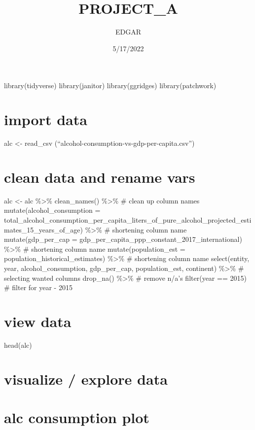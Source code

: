 \documentclass[
]{article}
\title{PROJECT\_A}
\author{EDGAR}
\date{5/17/2022}
\begin{document}
\maketitle

{
\setcounter{tocdepth}{2}
\tableofcontents
}
library(tidyverse) library(janitor) library(ggridges) library(patchwork)

\hypertarget{import-data}{%
\section{import data}\label{import-data}}

alc \textless- read\_csv (``alcohol-consumption-vs-gdp-per-capita.csv'')

\hypertarget{clean-data-and-rename-vars}{%
\section{clean data and rename vars}\label{clean-data-and-rename-vars}}

alc \textless- alc \%\textgreater\% clean\_names() \%\textgreater\% \#
clean up column names mutate(alcohol\_consumption =
total\_alcohol\_consumption\_per\_capita\_liters\_of\_pure\_alcohol\_projected\_estimates\_15\_years\_of\_age)
\%\textgreater\% \# shortening column name mutate(gdp\_per\_cap =
gdp\_per\_capita\_ppp\_constant\_2017\_international) \%\textgreater\%
\# shortening column name mutate(population\_est =
population\_historical\_estimates) \%\textgreater\% \# shortening column
name select(entity, year, alcohol\_consumption, gdp\_per\_cap,
population\_est, continent) \%\textgreater\% \# selecting wanted columns
drop\_na() \%\textgreater\% \# remove n/a's filter(year == 2015) \#
filter for year - 2015

\hypertarget{view-data}{%
\section{view data}\label{view-data}}

head(alc)

\hypertarget{visualize-explore-data}{%
\section{visualize / explore data}\label{visualize-explore-data}}

\hypertarget{alc-consumption-plot}{%
\section{alc consumption plot}\label{alc-consumption-plot}}
\end{document}
